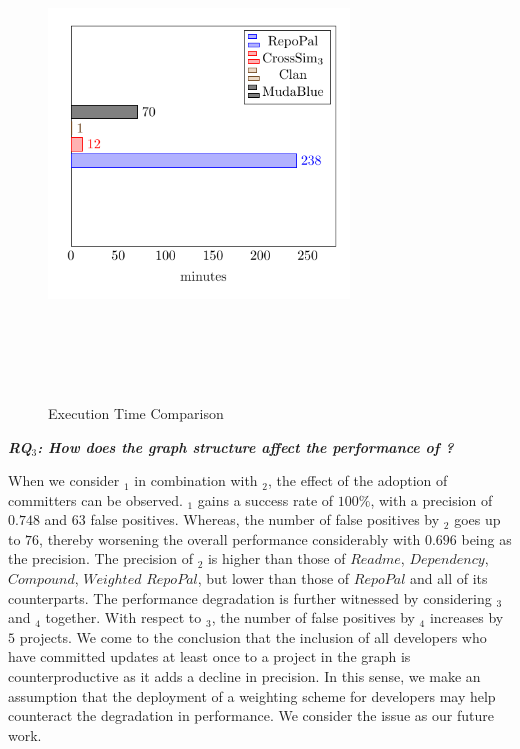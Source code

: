 \begin{figure}[!h]
\includegraphics[width=8cm,height=13cm,keepaspectratio]{images/ExecutionTime.pdf}
\centering
\caption{Execution Time Comparison}
\label{fig:LabelC}
\end{figure}



\newcommand{\rqthird}{RQ$_3$: How does the graph structure affect the performance of \CrossSim?}\textit{\textbf{\rqthird}} 


When we consider \CrossSimA$_{1}$ in combination with \CrossSimA$_{2}$, the effect of the adoption of committers can be observed. \CrossSimA$_{1}$ gains a success rate of $100\%$, with a precision of $0.748$ and $63$ false positives. Whereas, the number of false positives by \CrossSimA$_{2}$ goes up to $76$, thereby worsening the overall performance considerably with $0.696$ being as the precision. The precision of \CrossSimA$_{2}$ is higher than those of $Readme$, $Dependency$, $Compound$, $Weighted$ $RepoPal$, but lower than those of $RepoPal$ and all of its \CrossSim counterparts. The performance degradation is further witnessed by considering \CrossSimA$_{3}$ and \CrossSimA$_{4}$ together. With respect to \CrossSimA$_{3}$, the number of false positives by \CrossSimA$_{4}$ increases by $5$ projects. We come to the conclusion that the inclusion of all developers who have committed updates at least once to a project in the graph is counterproductive as it adds a decline in precision. In this sense, we make an assumption that the deployment of a weighting scheme for developers may help counteract the degradation in performance. We consider the issue as our future work. 

